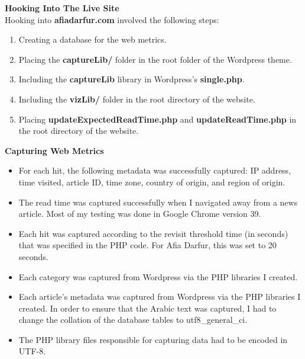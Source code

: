 \documentclass[12pt]{article}
\begin{document}
{\newpage

\noindent\textbf{Hooking Into The Live Site} \\ 

\noindent Hooking into \textbf{afiadarfur.com} involved the following steps:
\begin{enumerate}
\item Creating a database for the web metrics.
\item Placing the \textbf{captureLib/} folder in the root folder of the Wordpress theme.
\item Including the \textbf{captureLib} library in Wordpress's \textbf{single.php}. 
\item Including the \textbf{vizLib/} folder in the root directory of the website.
\item Placing \textbf{updateExpectedReadTime.php} and \textbf{updateReadTime.php} in the root directory of the website. 
\end{enumerate}

\vspace{0.2in}

\noindent\textbf{Capturing Web Metrics} 
\begin{itemize}
\item For each hit, the following metadata was successfully captured: IP address, time visited, article ID, time zone, country of origin, and region of origin.
\item  The read time was captured successfully when I navigated away from a news article. Most of my testing was done in Google Chrome version 39.
\item Each hit was captured according to the revisit threshold time (in seconds) that was specified in the PHP code. For Afia Darfur, this was set to 20 seconds.
\item Each category was captured from Wordpress via the PHP libraries I created.
\item Each article's metadata was captured from Wordpress via the PHP libraries I created. In order to ensure that the Arabic text was captured, I had to change the collation of the database tables to utf8\_general\_ci.
\item The PHP library files responsible for capturing data had to be encoded in UTF-8.
\end{itemize}

\vspace{0.2in}

}
\end{document}
